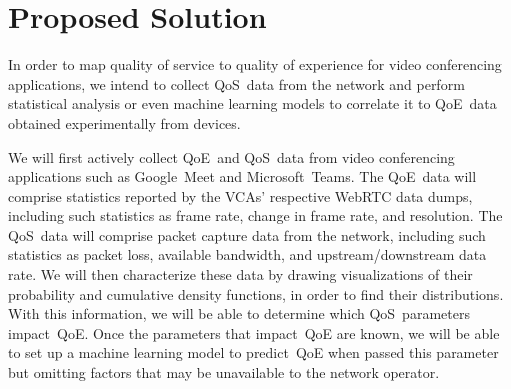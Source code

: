 \section{Proposed Solution}\label{proposed-solution}
    In order to map quality of service to quality of experience for video conferencing applications, we intend to collect QoS~data from the network and perform statistical analysis or even machine learning models to correlate it to QoE~data obtained experimentally from devices.

    We will first actively collect QoE~and QoS~data from video conferencing applications such as Google~Meet and Microsoft~Teams. The QoE~data will comprise statistics reported by the VCAs' respective WebRTC data dumps, including such statistics as frame rate, change in frame rate, and resolution. The QoS~data will comprise packet capture data from the network, including such statistics as packet loss, available bandwidth, and upstream/downstream data rate. We will then characterize these data by drawing visualizations of their probability and cumulative density functions, in order to find their distributions. With this information, we will be able to determine which QoS~parameters impact~QoE. Once the parameters that impact~QoE are known, we will be able to set up a machine learning model to predict~QoE when passed this parameter but omitting factors that may be unavailable to the network operator.
